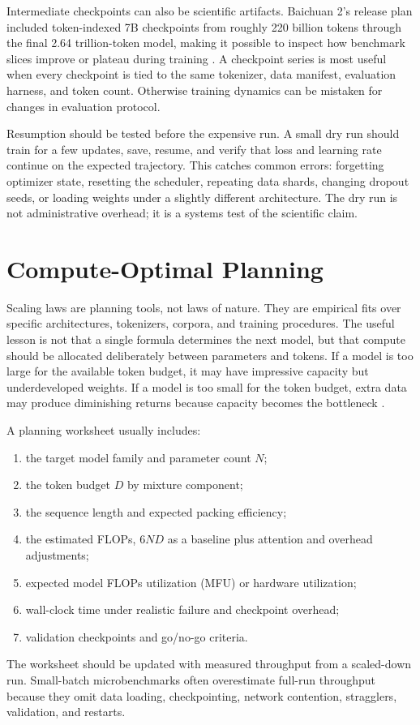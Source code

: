 Intermediate checkpoints can also be scientific artifacts. Baichuan 2's release plan included token-indexed 7B checkpoints from roughly 220 billion tokens through the final 2.64 trillion-token model, making it possible to inspect how benchmark slices improve or plateau during training \cite{yang2023baichuan2}. A checkpoint series is most useful when every checkpoint is tied to the same tokenizer, data manifest, evaluation harness, and token count. Otherwise training dynamics can be mistaken for changes in evaluation protocol.

Resumption should be tested before the expensive run. A small dry run should train for a few updates, save, resume, and verify that loss and learning rate continue on the expected trajectory. This catches common errors: forgetting optimizer state, resetting the scheduler, repeating data shards, changing dropout seeds, or loading weights under a slightly different architecture. The dry run is not administrative overhead; it is a systems test of the scientific claim.

\section{Compute-Optimal Planning}
\label{sec:compute-optimal-planning}

Scaling laws are planning tools, not laws of nature. They are empirical fits over specific architectures, tokenizers, corpora, and training procedures. The useful lesson is not that a single formula determines the next model, but that compute should be allocated deliberately between parameters and tokens. If a model is too large for the available token budget, it may have impressive capacity but underdeveloped weights. If a model is too small for the token budget, extra data may produce diminishing returns because capacity becomes the bottleneck \cite{hoffmann2022training}.

A planning worksheet usually includes:
\begin{enumerate}
\item the target model family and parameter count $N$;
\item the token budget $D$ by mixture component;
\item the sequence length and expected packing efficiency;
\item the estimated FLOPs, $6ND$ as a baseline plus attention and overhead adjustments;
\item expected model FLOPs utilization (MFU) or hardware utilization;
\item wall-clock time under realistic failure and checkpoint overhead;
\item validation checkpoints and go/no-go criteria.
\end{enumerate}
The worksheet should be updated with measured throughput from a scaled-down run. Small-batch microbenchmarks often overestimate full-run throughput because they omit data loading, checkpointing, network contention, stragglers, validation, and restarts.

